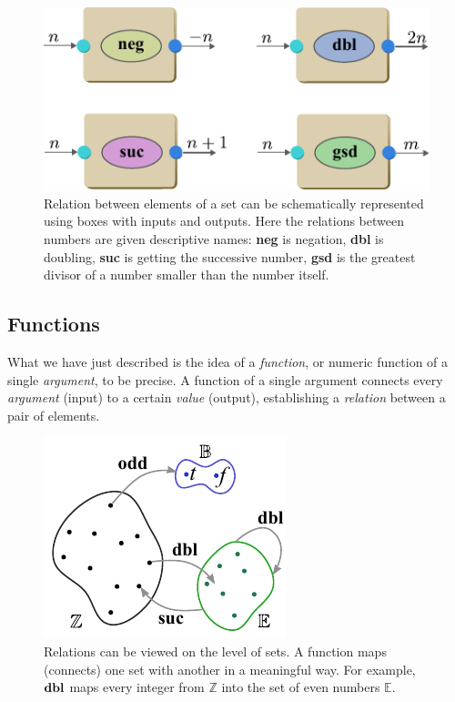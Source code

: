 \begin{figure}[htbp]
  \centering
  \includegraphics[scale=1.0]{schematicRelation1to1}
  \caption{Relation between elements of a set can be schematically
    represented using boxes with inputs and outputs. Here the
    relations between numbers are given descriptive names: {\bf neg}
    is negation, {\bf dbl} is doubling, {\bf suc} is getting the
    successive number, {\bf gsd} is the greatest divisor of a number smaller than
    the number itself.}
  \label{fig:schematicRelation1to1}
\end{figure}

\subsection{Functions}
What we have just described is the idea of a \emph{function}, or numeric
function of a single \emph{argument}, to be precise. A function of a
single argument connects every \emph{argument} (input) to a certain
\emph{value} (output), establishing a \emph{relation} between a pair
of elements.
\begin{figure}%
  \includegraphics[scale=1.0]{diagramFunctionSingleArg}
  \caption{Relations can be viewed on the level of sets. A function
    maps (connects) one set with another in a meaningful way. For
    example, $\textrm{\bf dbl}$ maps every integer from $\mathbb{Z}$
  into the set of even numbers $\mathbb{E}$.}
  \label{fig:diagramFunctionSingleArg}
\end{figure}

